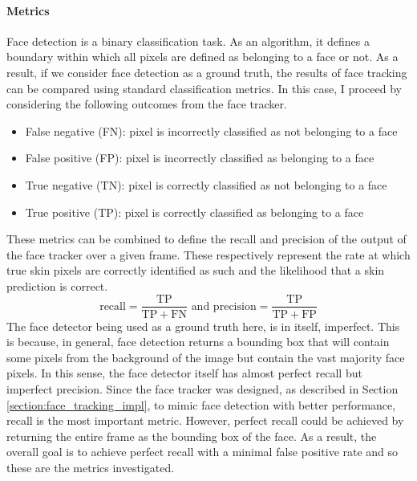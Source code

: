 \paragraph{Metrics}
Face detection is a binary classification task. As an algorithm, it defines a boundary within which all pixels are defined as belonging to a face or not.
As a result, if we consider face detection as a ground truth, the results of face tracking can be compared using standard classification metrics. In this case, I proceed by considering the following outcomes from the face tracker.
\begin{itemize}
   \item False negative (FN): pixel is incorrectly classified as not belonging to a face
   \item False positive (FP): pixel is incorrectly classified as belonging to a face
   \item True negative (TN): pixel is correctly classified as not belonging to a face 
   \item True positive (TP): pixel is correctly classified as belonging to a face 
\end{itemize}
These metrics can be combined to define the recall and precision of the output of the face tracker over a given frame. These respectively represent the rate at which true skin pixels are correctly identified as such and the likelihood that a skin prediction is correct.
\begin{equation*}
    \mathrm{recall} = \frac{\mathrm{TP}}{\mathrm{TP} + \mathrm{FN}} \text{ and } \mathrm{precision} = \frac{\mathrm{TP}}{\mathrm{TP}+\mathrm{FP}}
\end{equation*}
The face detector being used as a ground truth here, is in itself, imperfect. This is because, in general, face detection returns a bounding box
that will contain some pixels from the background of the image but contain the vast majority face pixels. In this sense, the face detector itself has almost perfect recall but imperfect precision.
Since the face tracker was designed, as described in Section \ref{section:face_tracking_impl}, to mimic face detection with better performance, recall is the most important metric. However, perfect recall
could be achieved by returning the entire frame as the bounding box of the face. As a result, the overall goal is to achieve perfect recall with a minimal false positive rate and so these are the metrics investigated.
